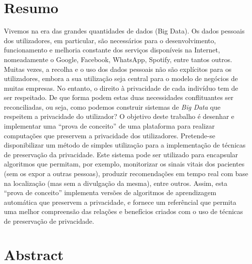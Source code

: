 %

\chapter*{Resumo} %
\thispagestyle{empty}

Vivemos na era das grandes quantidades de dados (Big Data). Os dados pessoais dos utilizadores, em particular, s\~{a}o necess\'{a}rios para o desenvolvimento, funcionamento e melhoria constante dos servi\c{c}os dispon\'{i}veis na Internet, nomeadamente o Google, Facebook, WhatsApp, Spotify, entre tantos outros. Muitas vezes, a recolha e o uso dos dados pessoais n\~{a}o s\~{a}o expl\'{i}citos para os utilizadores, embora a sua utiliza\c{c}\~{a}o seja central para o modelo de neg\'{o}cios de muitas empresas. No entanto, o direito \`{a} privacidade de cada indiv\'{i}duo tem de ser respeitado.
De que forma podem estas duas necessidades conflituantes ser reconciliadas, ou seja, como podemos construir sistemas de \textit{Big Data} que respeitem a privacidade do utilizador? O objetivo deste trabalho \'{e} desenhar e implementar uma ``prova de conceito'' de uma plataforma para realizar computa\c{c}\~{o}es que preservem a privacidade dos utilizadores. Pretende-se disponibilizar um m\'{e}todo de simples utiliza\c{c}\~{a}o para a implementa\c{c}\~{a}o de t\'{e}cnicas de preserva\c{c}\~{a}o da privacidade. Este sistema pode ser utilizado para encapsular algoritmos que permitam, por exemplo, monitorizar os sinais vitais dos pacientes (sem os expor a outras pessoas), produzir recomenda\c{c}\~{o}es em tempo real com base na localiza\c{c}\~{a}o (mas sem a divulga\c{c}\~{a}o da mesma), entre outros. Assim, esta ``prova de conceito'' implementa vers\~{o}es de algoritmos de aprendizagem autom\'{a}tica que preservem a privacidade, e fornece um refer\^{e}ncial que permita uma melhor compreens\~{a}o das rela\c{c}\~{o}es e benef\'{i}cios criados com o uso de t\'{e}cnicas de preserva\c{c}\~{a}o de privacidade.


\newpage

\chapter*{Abstract} %
\thispagestyle{empty}

